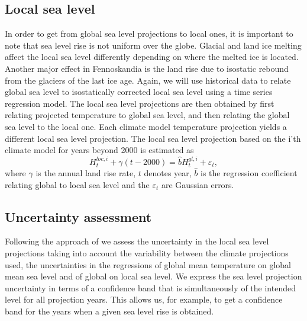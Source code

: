 \documentclass[note,screen,british,11pt]{nrdoc}
\begin{document}
\subsection{Local sea level}
In order to get from global sea level projections to local ones, it is important to note that sea level rise is not uniform over the globe. Glacial and land ice melting affect the local sea level differently depending on where the melted ice is located.
Another major effect in Fennoskandia is the land rise due to isostatic rebound from the glaciers of the last ice age. 
Again, we will use historical data to relate global sea level to isostatically corrected local sea level using a time series regression model. 
The local sea level projections are then obtained by first relating projected temperature to global sea level, and then relating the global sea level to the local one. Each climate model temperature projection yields a different local sea level projection. The local sea level projection based on the i'th climate model for years beyond 2000 is estimated as
\[H_t^{loc,i} + \gamma (t -2000 ) = {\hat b} H_t^{gl,i}  + {\varepsilon _t},\]
where $\gamma$ is the annual land rise rate, $t$ denotes year,  $ {\hat b} $ is the regression coefficient relating global to local sea level and the $\varepsilon _t$ are Gaussian errors.

\subsection{Uncertainty assessment}
\label{unc_ass}
Following the approach of \citet{Guttorp2014} we assess the uncertainty in the local sea level projections taking into account the variability between the climate projections used, the uncertainties in the regressions of global mean temperature on global mean sea level and of global on local sea level. We express the sea level projection uncertainty in terms of a confidence band that is simultaneously of the intended  level  for all projection years. This allows us, for example, to get a confidence band for the years when a given sea level rise is obtained. 
\end{document}
